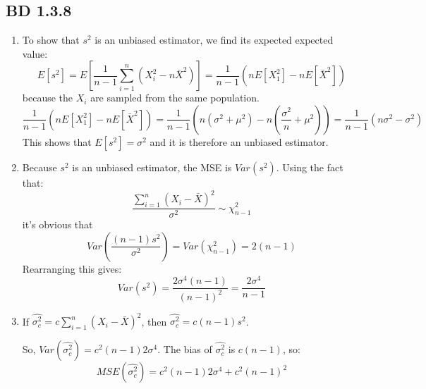 \documentclass[a4paper,12pt]{article}
\begin{document}
\subsection{BD 1.3.8}
\begin{enumerate}
  \item To show that $s^2$ is an unbiased estimator, we find its expected expected value:$$E[s^2]=E[\frac{1}{n-1}\sum_{i=1}^{n}(X_i^2-n\bar{X}^2)]=\frac{1}{n-1}(nE[X_1^2]-nE[\bar{X}^2])$$ because the $X_i$ are sampled from the same population. $$\frac{1}{n-1}(nE[X_1^2]-nE[\bar{X}^2])=\frac{1}{n-1}(n(\sigma^2+\mu^2)-n(\frac{\sigma^2}{n}+\mu^2))=\frac{1}{n-1}(n\sigma^2-\sigma^2)$$
  This shows that $E[s^2]=\sigma^2$ and it is therefore an unbiased estimator.
  \item Because $s^2$ is an unbiased estimator, the MSE is $Var(s^2)$. Using the fact that: $$\frac{\sum_{i=1}^n(X_i-\bar{X})^2}{\sigma^2}\sim\chi_{n-1}^2$$ it's obvious that $$Var(\frac{(n-1)s^2}{\sigma^2})=Var(\chi_{n-1}^2)=2(n-1)$$
  Rearranging this gives:$$Var(s^2)=\frac{2\sigma^4(n-1)}{(n-1)^2}=\frac{2\sigma^4}{n-1}$$
  \item If $\hat{\sigma^2_c}=c\sum_{i=1}^n(X_i-\bar{X})^2$, then $\hat{\sigma^2_c}=c(n-1)s^2$.

  So, $Var(\hat{\sigma^2_c})=c^2(n-1)2\sigma^4$. The bias of $\hat{\sigma^2_c}$ is $c(n-1)$, so:$$MSE(\hat{\sigma^2_c})=c^2(n-1)2\sigma^4+c^2(n-1)^2$$
\end{enumerate}
\end{document}

